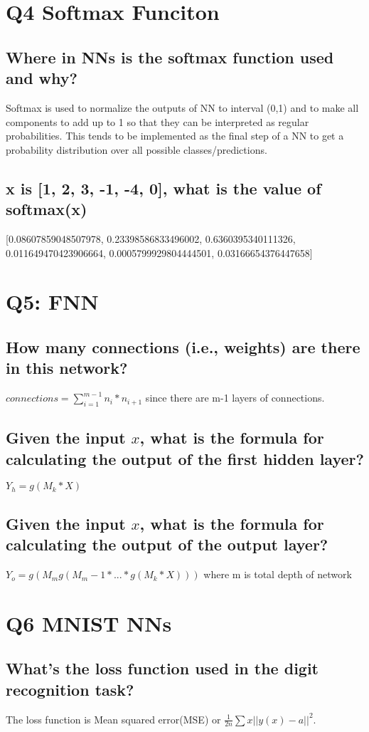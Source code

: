 \documentclass[11pt]{article}
\begin{document}
\section{Q4 Softmax Funciton}
\subsection{Where in NNs is the softmax function used and why?}
Softmax is used to normalize the outputs of NN to interval (0,1) and to make all components to add up to 1 so that they can be interpreted as regular probabilities. This tends to be implemented as the final step of a NN to get a probability distribution over all possible classes/predictions.  \\
\subsection{x is [1, 2, 3, -1, -4, 0], what is the value of softmax(x)}
[0.08607859048507978, 0.23398586833496002, 0.6360395340111326,\\ 0.011649470423906664, 0.0005799929804444501, 0.03166654376447658]
\section{Q5:  FNN}
\subsection{How many connections (i.e., weights) are there in this network?}
$ connections = \sum_{i=1}^{m-1} n_i*n_{i+1}$ since there are m-1 layers of connections.
\subsection{Given the input $x$, what is the formula for calculating the output of the first hidden layer?}
$Y_h = g(M_k*X) $ 
\subsection{Given the input $x$, what is the formula for calculating the output of the output layer?}
$Y_o = g(M_mg(M_m-1*...*g(M_k*X))) $  where m is total depth of network
\section{Q6 MNIST NNs}
\subsection{What's the loss function used in the digit recognition task?}
The loss function is Mean squared error(MSE) or $ \frac{1}{2n} \sum{x} ||y(x)-a||^2$. 
\end{document}
